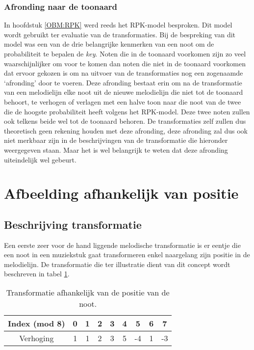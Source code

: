 \subsubsection{Afronding naar de toonaard}
In hoofdstuk \ref{OBM:RPK} werd reeds het RPK-model besproken. Dit model wordt gebruikt ter evaluatie van de transformaties. Bij de bespreking van dit model was een van de drie belangrijke kenmerken van een noot om de probabiliteit te bepalen de \textit{key}. Noten die in de toonaard voorkomen zijn zo veel waarschijnlijker om voor te komen dan noten die niet in de toonaard voorkomen dat ervoor gekozen is om na uitvoer van de transformaties nog een zogenaamde `afronding' door te voeren. Deze afronding bestaat erin om na de transformatie van een melodielijn elke noot uit de nieuwe melodielijn die niet tot de toonaard behoort, te verhogen of verlagen met een halve toon naar die noot van de twee die de hoogste probabiliteit heeft volgens het RPK-model. Deze twee noten zullen ook telkens beide wel tot de toonaard behoren. De transformaties zelf zullen dus theoretisch geen rekening houden met deze afronding, deze afronding zal dus ook niet merkbaar zijn in de beschrijvingen van de transformatie die hieronder weergegeven staan. Maar het is wel belangrijk te weten dat deze afronding uiteindelijk wel gebeurt.

\section{Afbeelding afhankelijk van positie}
\subsection{Beschrijving transformatie}
Een eerste zeer voor de hand liggende melodische transformatie is er eentje die een noot in een muziekstuk gaat transformeren enkel naargelang zijn positie in de melodielijn. De transformatie die ter illustratie dient van dit concept wordt beschreven in tabel \ref{tabel:transformatie1}.

\begin{table}
  \centering
  \begin{tabular}{c | c c c c c c c c }
    Index (mod 8) & 0 & 1 & 2 & 3 & 4 & 5 & 6 & 7 \\
    \hline
    \hline
    Verhoging & 1 & 1 & 2 & 3 & 5 & -4 & 1 & -3 \\
  \end{tabular}
  \caption{Transformatie afhankelijk van de positie van de noot.}
  \label{tabel:transformatie1}
\end{table}

